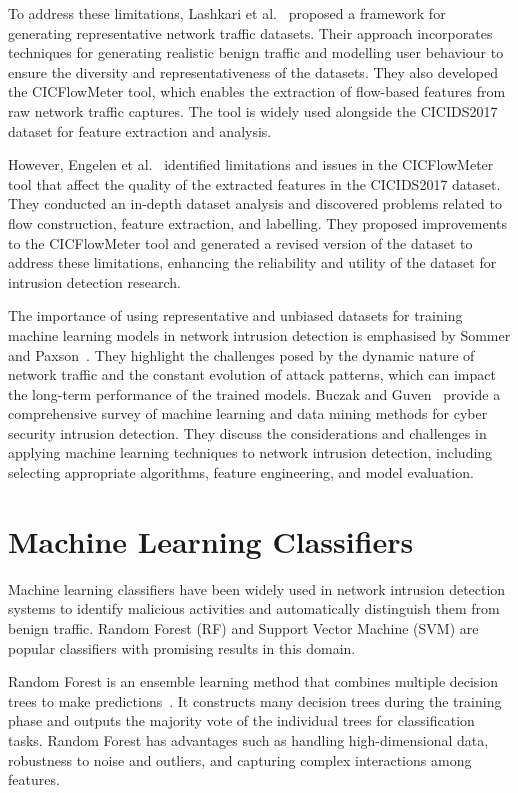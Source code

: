 To address these limitations, Lashkari et al.~\cite{lashkari2017characterization} proposed a framework for generating representative network traffic datasets. Their approach incorporates techniques for generating realistic benign traffic and modelling user behaviour to ensure the diversity and representativeness of the datasets. They also developed the CICFlowMeter tool, which enables the extraction of flow-based features from raw network traffic captures. The tool is widely used alongside the CICIDS2017 dataset for feature extraction and analysis.

However, Engelen et al.~\cite{engelen2021troubleshooting} identified limitations and issues in the CICFlowMeter tool that affect the quality of the extracted features in the CICIDS2017 dataset. They conducted an in-depth dataset analysis and discovered problems related to flow construction, feature extraction, and labelling. They proposed improvements to the CICFlowMeter tool and generated a revised version of the dataset to address these limitations, enhancing the reliability and utility of the dataset for intrusion detection research.

The importance of using representative and unbiased datasets for training machine learning models in network intrusion detection is emphasised by Sommer and Paxson~\cite{sommer2010outside}. They highlight the challenges posed by the dynamic nature of network traffic and the constant evolution of attack patterns, which can impact the long-term performance of the trained models. Buczak and Guven~\cite{buczak2015survey} provide a comprehensive survey of machine learning and data mining methods for cyber security intrusion detection. They discuss the considerations and challenges in applying machine learning techniques to network intrusion detection, including selecting appropriate algorithms, feature engineering, and model evaluation.
\section{Machine Learning Classifiers}\label{sec:classifiers}

Machine learning classifiers have been widely used in network intrusion detection systems to identify malicious activities and automatically distinguish them from benign traffic. Random Forest (RF) and Support Vector Machine (SVM) are popular classifiers with promising results in this domain.

Random Forest is an ensemble learning method that combines multiple decision trees to make predictions~\cite{hastie2009random}. It constructs many decision trees during the training phase and outputs the majority vote of the individual trees for classification tasks. Random Forest has advantages such as handling high-dimensional data, robustness to noise and outliers, and capturing complex interactions among features.

